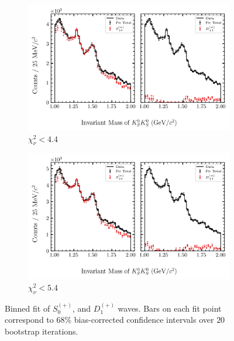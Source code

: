 \begin{figure}[htbp]
    \begin{subfigure}{0.45\textwidth}
        \includegraphics[width=\linewidth]{figures/binned_fit_chisqdof_4.4_splot_D_1s_2b_phase_factor_waves489_uncertainty_bootstrap-CI-BC.png}
        \caption{$\chi^2_\nu < 4.4$}
    \end{subfigure}
    \hfill
    \begin{subfigure}{0.45\textwidth}
        \includegraphics[width=\linewidth]{figures/binned_fit_chisqdof_5.4_splot_D_1s_2b_phase_factor_waves489_uncertainty_bootstrap-CI-BC.png}
        \caption{$\chi^2_\nu < 5.4$}
    \end{subfigure}

    \caption{Binned fit of $S_{0}^{(+)}$, and $D_{1}^{(+)}$ waves. Bars on each fit point correspond to $68\%$ bias-corrected confidence intervals over $20$ bootstrap iterations.}
    \label{fig:binned-fit-all-Sp-D1p}
\end{figure}

